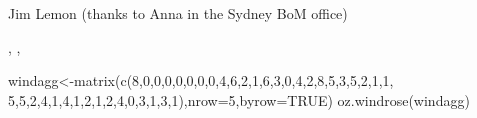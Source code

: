 \begin{Author}\relax
Jim Lemon (thanks to Anna in the Sydney BoM office)
\end{Author}
\begin{SeeAlso}\relax
{}, , 
\end{SeeAlso}
\begin{Examples}
\begin{ExampleCode}
 windagg<-matrix(c(8,0,0,0,0,0,0,0,4,6,2,1,6,3,0,4,2,8,5,3,5,2,1,1,
  5,5,2,4,1,4,1,2,1,2,4,0,3,1,3,1),nrow=5,byrow=TRUE)
 oz.windrose(windagg)
\end{ExampleCode}
\end{Examples}

